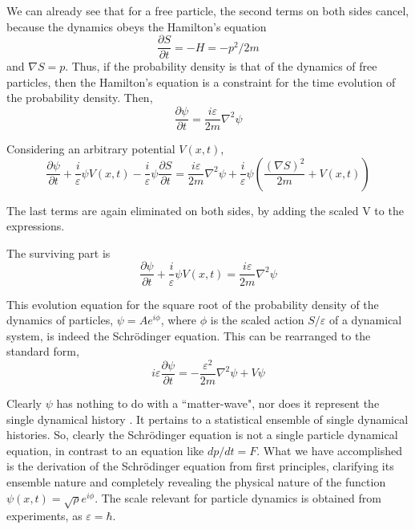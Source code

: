 We can already see that for a free particle, the second terms on both sides cancel, because
the dynamics obeys the Hamilton's equation
\begin{equation*}
\frac{\partial S}{\partial t} = -H = -p^2 / 2m \tag{18}\label{c14-eq18}
\end{equation*}
and $\nabla S = p$. Thus, if the probability density is that of the dynamics of free particles, then
the Hamilton's equation is a constraint for the time evolution of the probability density.
Then,
\begin{equation*}
\frac{\partial\psi}{\partial t} = \frac{i\varepsilon}{2m} \nabla^2 \psi \tag{19}\label{c14-eq19}
\end{equation*}

Considering an arbitrary potential $V (x, t)$,
\begin{equation*}
\frac{\partial \psi}{\partial t} + \frac{i}{\varepsilon} \psi V (x,t) - \frac{i}{\varepsilon} \psi \frac{\partial S}{\partial t} = \frac{i\varepsilon}{2m} \nabla^2 \psi + \frac{i}{\varepsilon} \psi \left( \frac{(\nabla S)^2}{2m} + V (x,t)\right)  \tag{20}\label{c14-eq20}
\end{equation*}

The last terms are again eliminated on both sides, by adding the scaled V to the expressions.

The surviving part is
\begin{equation*}
\frac{\partial \psi}{\partial t} + \frac{i}{\varepsilon} \psi V (x,t) = \frac{i \varepsilon}{2m} \nabla^2 \psi \tag{21}\label{c14-eq21}
\end{equation*}


This evolution equation for the square root of the probability density of the dynamics of
particles, $\psi = Ae^{i\phi}$, where $\phi$ is the scaled action $S/\varepsilon$ of a dynamical system, is indeed the
Schr\"{o}dinger equation. This can be rearranged to the standard form,
\begin{equation*}
i \varepsilon \frac{\partial \psi}{\partial t} = - \frac{\varepsilon^2}{2m} \nabla^2 \psi + V \psi \tag{22}\label{c14-eq22}
\end{equation*}

Clearly $\psi$ has nothing to do with a ``matter-wave", nor does it represent the single dynamical
history \cite{chap14-key2}. It pertains to a statistical ensemble of single dynamical histories. So, clearly the
Schr\"{o}dinger equation is not a single particle dynamical equation, in contrast to an equation
like $dp/dt = F$. What we have accomplished is the derivation of the Schr\"{o}dinger equation
from first principles, clarifying its ensemble nature and completely revealing the physical
nature of the function $\psi (x, t) = \sqrt{\rho}e^{i\phi}$. The scale relevant for particle dynamics is obtained
from experiments, as $\varepsilon = \hbar$.

